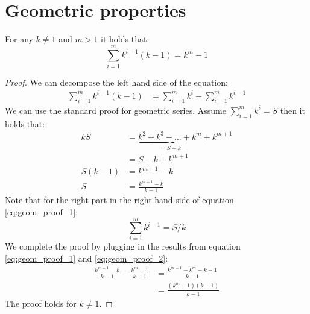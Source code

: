 \section*{Geometric properties}

\begin{prop}
For any $k \neq 1$ and $m > 1 $ it holds that:
\begin{equation}
\sum_{i = 1}^{m} k^{i-1}(k - 1) = k^m -1
\end{equation}
\end{prop}
\begin{proof}
We can decompose the left hand side of the equation:
\begin{equation}
\label{eq:geom_proof_1}
\begin{split}
\sum_{i = 1}^{m} k^{i-1}(k - 1)
	&= \sum_{i = 1}^{m}k^i - \sum_{i = 1}^{m} k^{i-1}
\end{split}\end{equation}
We can use the standard proof for geometric series. Assume
$\sum_{i = 1}^{m}k^i = S$ then it holds that:
\begin{equation}\label{eq:geom_proof_2}\begin{split}
kS 
	&= \underbrace{k^2 + k^3 + \dots + k^m}_{= S - k} + k^{m+1} \\
	&= S - k + k^{m+1}\\
S(k-1) 
	&= 	k^{m+1} - k \\
S 
	&= \frac{k^{m+1} - k}{k - 1}
\end{split}\end{equation}
Note that for the right part in the right hand side of equation
\ref{eq:geom_proof_1}:
\begin{equation}
\sum_{i=1}^{m} k^{i-1} = S/k
\end{equation}
We complete the proof by plugging in the results from equation
\ref{eq:geom_proof_1} and \ref{eq:geom_proof_2}:
\begin{equation}\begin{split}
\frac{k^{m+1} - k}{k - 1} - \frac{k^m - 1}{k - 1} 
	&= \frac{k^{m+1} - k^m - k + 1}{k - 1}\\
	&= \frac{(k^m -1)(k-1)}{k -1}
\end{split}\end{equation}
The proof holds for $k \neq 1$.
\end{proof}